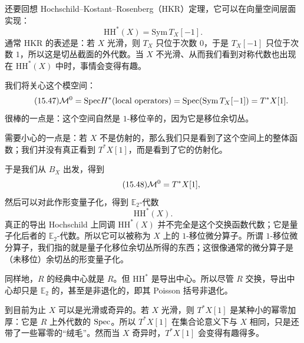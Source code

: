 还要回想 Hochschild--Kostant--Rosenberg（HKR）定理，它可以在向量空间层面实现：
\begin{equation}\tag{15.46}
\mathrm{HH}^*(X)=\mathrm{Sym}\,T_X[-1].
\end{equation}
通常 HKR 的表述是：若 $X$ 光滑，则 $T_X$ 只位于次数 $0$，于是 $T_X[-1]$ 只位于次数 $1$，所以这是切丛截面的外代数。当 $X$ 不光滑、从而我们看到对称代数也出现在 $\mathrm{HH}^*(X)$ 中时，事情会变得有趣。%

我们将关心这个模空间：
\begin{equation}\tag{15.47}
\mathcal{M}^0=\mathrm{Spec} H^*(\text{local operators})=\mathrm{Spec}(\mathrm{Sym}\,T_X[-1])=T^*X[1].
\end{equation}
很棒的一点是：这个空间自然是 $1$-移位辛的，因为它是移位余切丛。

需要小心的一点是：若 $X$ 不是仿射的，那么我们只是看到了这个空间上的整体函数；我们并没有真正看到 $T^*X[1]$，而是看到了它的仿射化。

于是我们从 $B_X$ 出发，得到
\begin{equation}\tag{15.48}
\mathcal{M}^0=T^*X[1],
\end{equation}
然后可以对此作形变量子化，得到 $\mathbb{E}_2$-代数
\begin{equation}\tag{15.49}
\mathrm{HH}^*(X).
\end{equation}
真正的导出 Hochschild 上同调 $\mathrm{HH}^*(X)$ 并不完全是这个交换函数代数；它是量子化后者的 $\mathbb{E}_2$-代数。所以它可以被称为 $X$ 上的 $1$-移位微分算子。所谓 $1$-移位微分算子，我们指的就是量子化移位余切丛所得的东西；这很像通常的微分算子是（未移位）余切丛的形变量子化。%

同样地，$R$ 的经典中心就是 $R$。但 $\mathrm{HH}^*$ 是导出中心。所以尽管 $R$ 交换，导出中心却只是 $\mathbb{E}_2$ 的，甚至是非退化的，即其 Poisson 括号非退化。

到目前为止 $X$ 可以是光滑或奇异的。若 $X$ 光滑，则 $T^*X[1]$ 是某种小的幂零加厚：它是 $R$ 上外代数的 $\mathrm{Spec}$。所以 $T^*X[1]$ 在集合论意义下与 $X$ 相同，只是还带了一些幂零的“绒毛”。然而当 $X$ 奇异时，$T^*X[1]$ 会变得有趣得多。%

